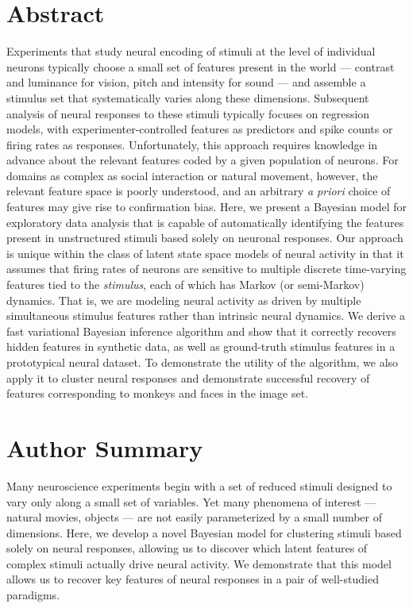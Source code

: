 \documentclass[12pt,a4paper]{article}
\begin{document}
\section*{Abstract}
Experiments that study neural encoding of stimuli at the level of individual neurons typically choose a small set of features present in the world --- contrast and luminance for vision, pitch and intensity for sound --- and assemble a stimulus set that systematically varies along these dimensions. Subsequent analysis of neural responses to these stimuli typically focuses on regression models, with experimenter-controlled features as predictors and spike counts or firing rates as responses. Unfortunately, this approach requires knowledge in advance about the relevant features coded by a given population of neurons. For domains as complex as social interaction or natural movement, however, the relevant feature space is poorly understood, and an arbitrary \emph{a priori} choice of features may give rise to confirmation bias. Here, we present a Bayesian model for exploratory data analysis that is capable of automatically identifying the features present in unstructured stimuli based solely on neuronal responses. Our approach is unique within the class of latent state space models of neural activity in that it assumes that firing rates of neurons are sensitive to multiple discrete time-varying features tied to the \emph{stimulus}, each of which has Markov (or semi-Markov) dynamics. That is, we are modeling neural activity as driven by multiple simultaneous stimulus features rather than intrinsic neural dynamics.  We derive a fast variational Bayesian inference algorithm and show that it correctly recovers hidden features in synthetic data, as well as ground-truth stimulus features in a prototypical neural dataset. To demonstrate the utility of the algorithm, we also apply it to cluster neural responses and demonstrate successful recovery of features corresponding to monkeys and faces in the image set.

\section*{Author Summary}
Many neuroscience experiments begin with a set of reduced stimuli designed to vary only along a small set of variables. Yet many phenomena of interest --- natural movies, objects --- are not easily parameterized by a small number of dimensions. Here, we develop a novel Bayesian model for clustering stimuli based solely on neural responses, allowing us to discover which latent features of complex stimuli actually drive neural activity. We demonstrate that this model allows us to recover key features of neural responses in a pair of well-studied paradigms.
\end{document}
